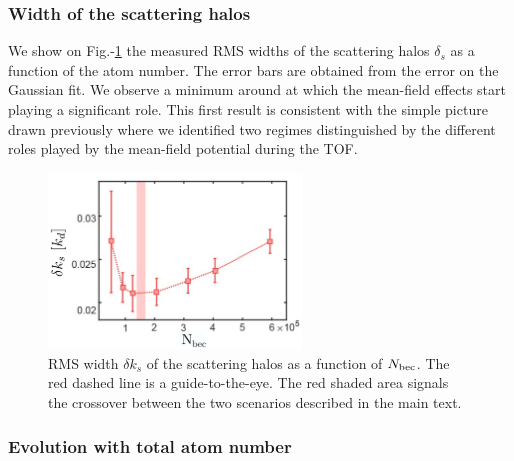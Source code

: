 \subsubsection{Width of the scattering halos}

\label{sec:width_halos}

We show on Fig.-\ref{fig:largeur_spheres} the measured RMS widths of the scattering halos $\delta_s$ as a function of the atom number. The error bars are obtained from the error on the Gaussian fit. We observe a minimum around  at which the mean-field effects start playing a significant role. This first result is consistent with the simple picture drawn previously where we identified two regimes distinguished by the different roles played by the mean-field potential during the TOF.

\begin{figure}
    \centering
    \includegraphics[width=0.6\textwidth]{Fig/Chapter3/largeur_spheres.png}
    \caption[RMS width $\delta k_s$ of the scattering halos as a function of $N_{\rm{bec}}$]{RMS width $\delta k_s$ of the scattering halos as a function of $N_{\rm{bec}}$. The red dashed line is a guide-to-the-eye. The red shaded area signals the crossover between the two scenarios described in the main text.}
    \label{fig:largeur_spheres}
\end{figure}

\subsubsection{Evolution with total atom number}

